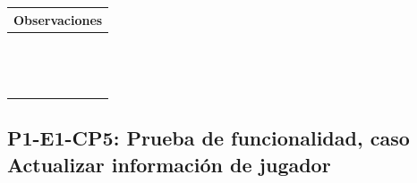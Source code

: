 \documentclass[oneside,10pt]{book}
\begin{document}
\begin{tabularx}{\textwidth}{ X }
\multicolumn{1}{X}{\cellcolor[HTML]{9B9B9B}\textbf{Observaciones}} \\ \hline
\multicolumn{1}{|l|}{ }	\\
\multicolumn{1}{|l|}{ }	\\
\multicolumn{1}{|l|}{ }	\\
\multicolumn{1}{|l|}{ }	\\
\multicolumn{1}{|l|}{ }	\\
\multicolumn{1}{|l|}{ }	\\
\multicolumn{1}{|l|}{ }	\\
\multicolumn{1}{|l|}{ }	\\
\multicolumn{1}{|l|}{ }	\\
\multicolumn{1}{|l|}{ }	\\
\multicolumn{1}{|l|}{ }	\\
\multicolumn{1}{|l|}{ }	\\
\multicolumn{1}{|l|}{ }	\\
\multicolumn{1}{|l|}{ }	\\ \hline
\end{tabularx}
\newpage
\subsection{P1-E1-CP5: Prueba de funcionalidad, caso Actualizar información de jugador}
\end{document}
